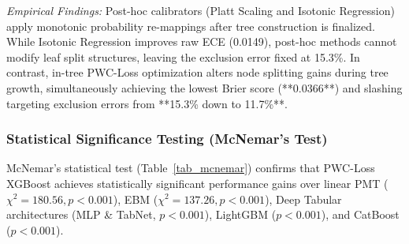 \documentclass[conference]{IEEEtran}
\begin{document}
\begin{table}[htbp]
\caption{Comparative Evaluation: In-Tree PWC-Loss vs. Post-Hoc Recalibration Methods}
\begin{center}
\label{tab_posthoc_comp}
\end{center}
\end{table}

\textit{Empirical Findings:} Post-hoc calibrators (Platt Scaling and Isotonic Regression) apply monotonic probability re-mappings after tree construction is finalized. While Isotonic Regression improves raw ECE (0.0149), post-hoc methods cannot modify leaf split structures, leaving the exclusion error fixed at 15.3\%. In contrast, in-tree PWC-Loss optimization alters node splitting gains during tree growth, simultaneously achieving the lowest Brier score (**0.0366**) and slashing targeting exclusion errors from **15.3\% down to 11.7\%**.

\subsubsection{Statistical Significance Testing (McNemar's Test)}
McNemar's statistical test (Table~\ref{tab_mcnemar}) confirms that PWC-Loss XGBoost achieves statistically significant performance gains over linear PMT ($\chi^2 = 180.56, p < 0.001$), EBM ($\chi^2 = 137.26, p < 0.001$), Deep Tabular architectures (MLP & TabNet, $p < 0.001$), LightGBM ($p < 0.001$), and CatBoost ($p < 0.001$).
\end{document}
